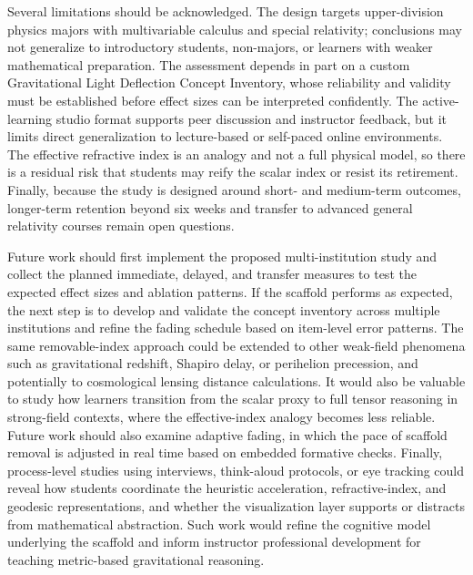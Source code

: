 \documentclass{article}
\begin{document}
Several limitations should be acknowledged. The design targets upper-division physics majors with multivariable calculus and special relativity; conclusions may not generalize to introductory students, non-majors, or learners with weaker mathematical preparation. The assessment depends in part on a custom Gravitational Light Deflection Concept Inventory, whose reliability and validity must be established before effect sizes can be interpreted confidently. The active-learning studio format supports peer discussion and instructor feedback, but it limits direct generalization to lecture-based or self-paced online environments. The effective refractive index is an analogy and not a full physical model, so there is a residual risk that students may reify the scalar index or resist its retirement. Finally, because the study is designed around short- and medium-term outcomes, longer-term retention beyond six weeks and transfer to advanced general relativity courses remain open questions.

Future work should first implement the proposed multi-institution study and collect the planned immediate, delayed, and transfer measures to test the expected effect sizes and ablation patterns. If the scaffold performs as expected, the next step is to develop and validate the concept inventory across multiple institutions and refine the fading schedule based on item-level error patterns. The same removable-index approach could be extended to other weak-field phenomena such as gravitational redshift, Shapiro delay, or perihelion precession, and potentially to cosmological lensing distance calculations. It would also be valuable to study how learners transition from the scalar proxy to full tensor reasoning in strong-field contexts, where the effective-index analogy becomes less reliable. Future work should also examine adaptive fading, in which the pace of scaffold removal is adjusted in real time based on embedded formative checks. Finally, process-level studies using interviews, think-aloud protocols, or eye tracking could reveal how students coordinate the heuristic acceleration, refractive-index, and geodesic representations, and whether the visualization layer supports or distracts from mathematical abstraction. Such work would refine the cognitive model underlying the scaffold and inform instructor professional development for teaching metric-based gravitational reasoning.



\end{document}
